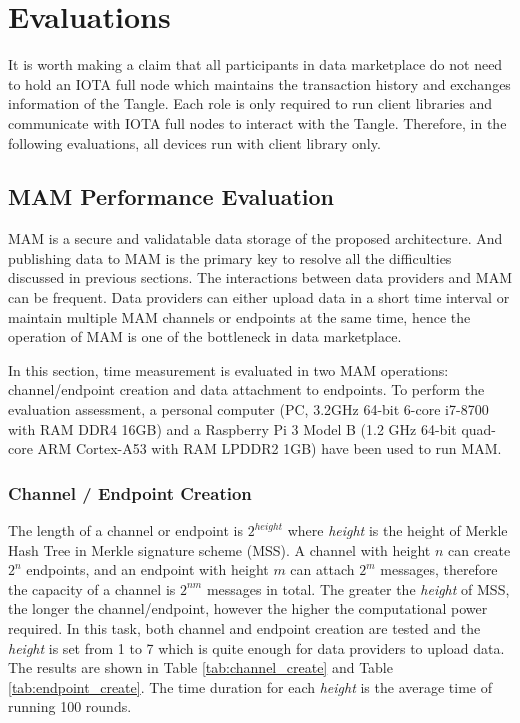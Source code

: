\documentclass[journal,article,applsci,submit,moreauthors,pdftex]{Definitions/mdpi}
\begin{document}
\section{Evaluations}
It is worth making a claim that all participants in data marketplace do not need to hold an IOTA full node which maintains the transaction history and exchanges information of the Tangle. Each role is only required to run client libraries and communicate with IOTA full nodes to interact with the Tangle. Therefore, in the following evaluations, all devices run with client library only.

\subsection{MAM Performance Evaluation}
MAM is a secure and validatable data storage of the proposed architecture. And publishing data to MAM is the primary key to resolve all the difficulties discussed in previous sections. The interactions between data providers and MAM can be frequent. Data providers can either upload data in a short time interval or maintain multiple MAM channels or endpoints at the same time, hence the operation of MAM is one of the bottleneck in data marketplace.

In this section, time measurement is evaluated in two MAM operations: channel/endpoint creation and data attachment to endpoints. To perform the evaluation assessment, a personal computer (PC, 3.2GHz 64-bit 6-core i7-8700 with RAM DDR4 16GB) and a Raspberry Pi 3 Model B (1.2 GHz 64-bit quad-core ARM Cortex-A53 with RAM LPDDR2 1GB) have been used to run MAM. 

\subsubsection{Channel / Endpoint Creation}
The length of a channel or endpoint is $2^{height}$ where \textit{height} is the height of Merkle Hash Tree in Merkle signature scheme (MSS). A channel with height $n$ can create $2^n$ endpoints, and an endpoint with height $m$ can attach $2^m$ messages, therefore the capacity of a channel is $2^{nm}$ messages in total. The greater the \textit{height} of MSS, the longer the channel/endpoint, however the higher the computational power required. In this task, both channel and endpoint creation are tested and the \textit{height} is set from 1 to 7 which is quite enough for data providers to upload data. The results are shown in Table \ref{tab:channel_create} and Table \ref{tab:endpoint_create}. The time duration for each \textit{height} is the average time of running 100 rounds.
\end{document}
